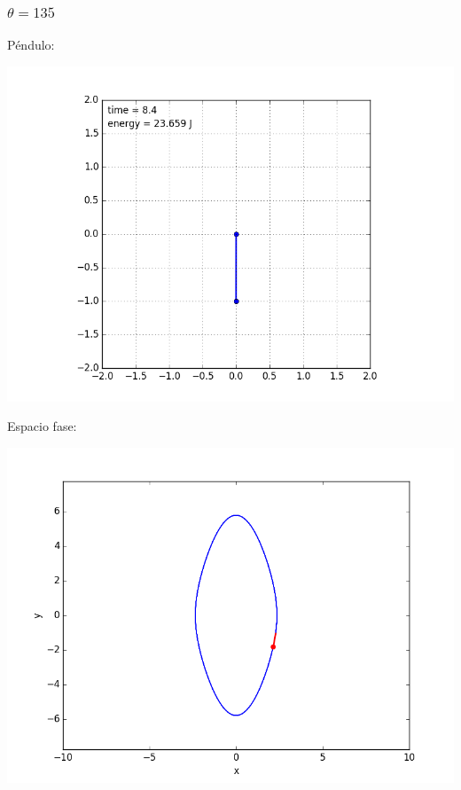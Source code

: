 \documentclass[12pt,letterpaper]{article}
\begin{document}
\subsubsection*{$\theta = 135$}
Péndulo:
\begin{center}
\includegraphics[scale=0.3]{135.png}
\end{center}
Espacio fase:
\begin{center}
\includegraphics[scale=0.3]{1351.png}
\end{center}
\end{document}
